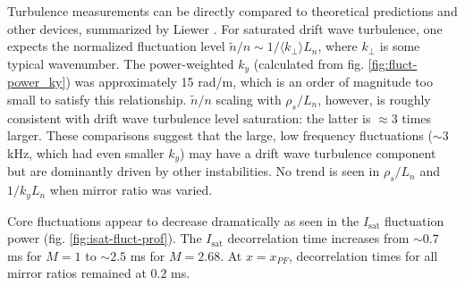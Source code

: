 Turbulence measurements can be directly compared to theoretical predictions and other devices, summarized by Liewer \cite{Liewer_measurements_1985}. For saturated drift wave turbulence, one expects the normalized fluctuation level $\tilde{n}/n \sim 1/\langle k_\perp \rangle L_n$, where $k_\perp$ is some typical wavenumber. The power-weighted $k_y$ (calculated from fig. \ref{fig:fluct-power_ky}) was approximately 15 rad/m, which is an order of magnitude too small to satisfy this relationship. $\tilde{n}/n$ scaling with $\rho_s / L_n$, however, is roughly consistent with drift wave turbulence level saturation: the latter is $\approx 3$ times larger. These comparisons suggest that the large, low frequency fluctuations ($\sim 3$ kHz, which had even smaller $k_y$) may have a drift wave turbulence component but are dominantly driven by other instabilities. No trend is seen in $\rho_s / L_n$ and $1/k_y L_n$ when mirror ratio was varied.

Core fluctuations appear to decrease dramatically as seen in the $I_\text{sat}$ fluctuation power (fig. \ref{fig:isat-fluct-prof}). The $I_\text{sat}$ decorrelation time increases from $\sim0.7$ ms for $M=1$ to $\sim2.5$ ms for $M=2.68$. At $x=x_{PF}$, decorrelation times for all mirror ratios remained at $0.2$ ms.

